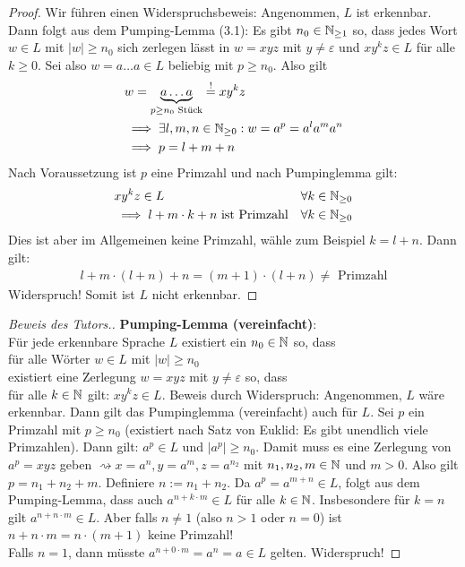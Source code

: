 \begin{proof}
	Wir führen einen Widerspruchsbeweis: Angenommen, $L$ ist erkennbar.
	Dann folgt aus dem Pumping-Lemma (3.1): Es gibt $n_0\in\mathbb{N}_{\geq1}$ so, dass jedes Wort $w\in L$ mit $|w|\geq n_0$ sich zerlegen lässt in $w=xyz$ mit $y\neq\varepsilon$ und $xy^kz\in L$ für alle $k\geq0$.
	Sei also $w=a\ldots a\in L$ beliebig mit $p\geq n_0$. Also gilt
	\begin{align*}
		&w=\underbrace{a\ldots a}_{p\geq n_0\text{ Stück}}\overset{!}= xy^k z\\
		&\implies \exists l,m,n\in\mathbb{N}_{\geq0}: w=a^p=a^l a^m a^n\\
		&\implies p=l+m+n
	\end{align*}
	Nach Voraussetzung ist $p$ eine Primzahl und nach Pumpinglemma gilt:
	\begin{align*}
		&x y^k z\in L &\forall k\in\mathbb{N}_{\geq0}\\
		&\implies l+m\cdot k+ n\text{ ist Primzahl} &\forall k\in\mathbb{N}_{\geq0}
	\end{align*}
	Dies ist aber im Allgemeinen keine Primzahl, wähle zum Beispiel $k=l+n$.
	Dann gilt:
	\begin{align*}
		l+m\cdot(l+n)+n=(m+1)\cdot(l+n)\neq\text{ Primzahl}
	\end{align*}
	Widerspruch! Somit ist $L$ nicht erkennbar.
\end{proof}

\begin{proof}[Beweis des Tutors.]\enter
	\textbf{Pumping-Lemma (vereinfacht)}:\\
	Für jede erkennbare Sprache $L$ existiert ein $n_0\in\mathbb{N}$ so, dass\\
	für alle Wörter $w\in L$ mit $|w|\geq n_0$\\
	existiert eine Zerlegung $w=xyz$ mit $y\neq\varepsilon$ so, dass\\
	für alle $k\in\mathbb{N}$ gilt: $xy^kz\in L$.\nl
	Beweis durch Widerspruch:
	Angenommen, $L$ wäre erkennbar. Dann gilt das Pumpinglemma (vereinfacht) auch für $L$.
	Sei $p$ ein Primzahl mit $p\geq n_0$ (existiert nach Satz von Euklid: Es gibt unendlich viele Primzahlen).
	Dann gilt:
	$a^p\in L$ und $|a^p|\geq n_0$.
	Damit muss es eine Zerlegung von $a^p=xyz$ geben $\rightsquigarrow x=a^n,y=a^m,z=a^{n_2}$ mit $n_1,n_2,m\in\mathbb{N}$ und $m>0$.
	Also gilt $p=n_1+n_2+m$. 
	Definiere $n:=n_1+n_2$.
	Da $a^p=a^{m+n}\in L$, folgt aus dem Pumping-Lemma,
	dass auch $a^{n+k\cdot m}\in L$ für alle $k\in\mathbb{N}$.
	Insbesondere für $k=n$ %
	gilt $a^{n+n\cdot m}\in L$.
	Aber falls $n\neq1$ (also $n>1$ oder $n=0$) ist $n+n\cdot m=n\cdot(m+1)$ keine Primzahl!\\
	Falls $n=1$, dann müsste $a^{n+0\cdot m}=a^n=a\in L$ gelten. Widerspruch!
\end{proof}

